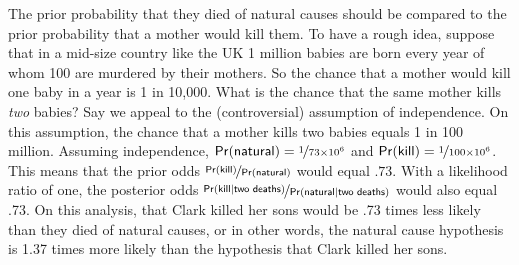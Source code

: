 \documentclass{article}
\newcommand{\pr}{\mathsf{Pr}}
\begin{document}
The prior probability that they died of natural causes 
should be compared to the prior probability that a mother would kill them. %
To have a rough idea, suppose that in a mid-size country like the UK 1 million babies are born every year of whom 100 are murdered by their mothers. So the chance that a mother would kill one baby in a year is 1 in 10,000. What is the chance that the same mother kills \textit{two} babies? Say we appeal to the (controversial) assumption of independence. On this assumption, the chance that a mother kills two babies equals %
1 in 100 million. %
Assuming independence, 
$\pr(\textsf{natural})=\nicefrac{1}{73\times10^6}$ and $\pr(\textsf{kill})=\nicefrac{1}{100\times 10^6}$.
%
This means that the prior odds $\nicefrac{\pr(\textsf{kill})}{\pr(\textsf{natural})}$ would equal $.73$. 
With a likelihood ratio of one, the posterior 
odds $ \nicefrac{\pr(\textsf{kill} \vert \textsf{two deaths})}{\pr(\textsf{natural} \vert \textsf{two deaths})}$ would also equal .73. On this analysis, that Clark killed her sons would be .73 times less likely than they died of natural causes, or in other words, the natural cause hypothesis is 1.37 times more likely than the hypothesis that Clark killed her sons. 



%
\end{document}
